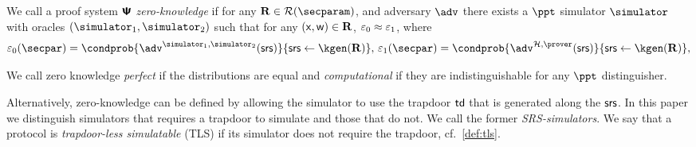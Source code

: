 
We call a proof system $\bm{\mathsf{\Psi}}$ \emph{zero-knowledge} if for any
$\REL \in \RELGEN(\secparam)$, and adversary $\adv$ there exists a $\ppt$ simulator
$\simulator$ with oracles $(\simulator_1,\simulator_2)$ such that for any $(\mathsf{x}, \mathsf{w}) \in \mathbf{R}$, $\varepsilon_0 \approx \varepsilon_1$,
where
\[
  \eps_0(\secpar) = \condprob{\adv^{\simulator_1,\simulator_2} (\srs)}{\srs \gets \kgen
    (\REL)},\,  \eps_1 (\secpar) = \condprob{\adv^{\ro,\prover} (\srs)}{\srs \gets \kgen (\REL)},
\]

We call zero knowledge \emph{perfect} if the distributions are equal and
\emph{computational} if they are indistinguishable for any $\ppt$ distinguisher.


Alternatively, zero-knowledge can be defined by allowing the simulator to use the
trapdoor $\mathsf{td}$ that is generated along the $\mathsf{srs}$. In this paper we distinguish
simulators that requires a trapdoor to simulate and those that do not. We call the
former \emph{SRS-simulators}. We say that a protocol is \emph{trapdoor-less
  simulatable} (TLS) if its simulator does not require the trapdoor, cf.~\cref{def:tls}.

